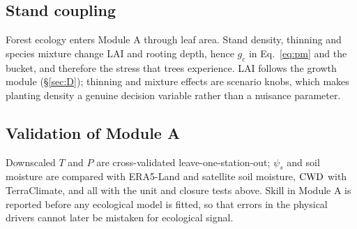 \subsection{Stand coupling}
Forest ecology enters Module A through leaf area. Stand density, thinning and species mixture change $\mathrm{LAI}$ and rooting depth, hence $g_c$ in Eq.~\eqref{eq:pm} and the bucket, and therefore the stress that trees experience. LAI follows the growth module (\S\ref{sec:D}); thinning \citep{Sohn2016} and mixture effects \citep{Grossiord2020} are scenario knobs, which makes planting density a genuine decision variable rather than a nuisance parameter.

\subsection{Validation of Module A}
Downscaled $T$ and $P$ are cross-validated leave-one-station-out; $\psi_s$ and soil moisture are compared with ERA5-Land and satellite soil moisture, $\mathrm{CWD}$ with TerraClimate, and all with the unit and closure tests above. Skill in Module A is reported before any ecological model is fitted, so that errors in the physical drivers cannot later be mistaken for ecological signal.
